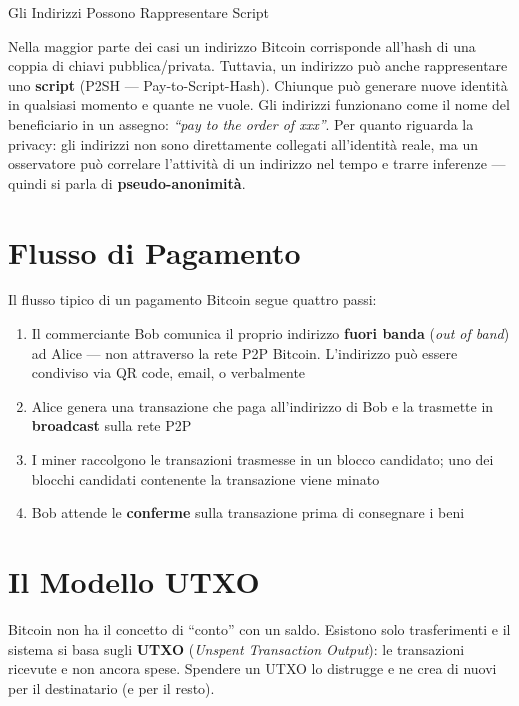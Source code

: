 \documentclass[
  italian,
  openany]{book}
\providecommand{\tightlist}{%
  \setlength{\itemsep}{0pt}\setlength{\parskip}{0pt}}
\begin{document}
\begin{calloutnote}{Gli Indirizzi Possono Rappresentare Script}

Nella maggior parte dei casi un indirizzo Bitcoin corrisponde all'hash
di una coppia di chiavi pubblica/privata. Tuttavia, un indirizzo può
anche rappresentare uno \textbf{script} (P2SH --- Pay-to-Script-Hash).
Chiunque può generare nuove identità in qualsiasi momento e quante ne
vuole. Gli indirizzi funzionano come il nome del beneficiario in un
assegno: \emph{``pay to the order of xxx''}. Per quanto riguarda la
privacy: gli indirizzi non sono direttamente collegati all'identità
reale, ma un osservatore può correlare l'attività di un indirizzo nel
tempo e trarre inferenze --- quindi si parla di
\textbf{pseudo-anonimità}.

\end{calloutnote}

\section{Flusso di Pagamento}\label{flusso-di-pagamento}

Il flusso tipico di un pagamento Bitcoin segue quattro passi:

\begin{enumerate}
\def\labelenumi{\arabic{enumi}.}
\tightlist
\item
  Il commerciante Bob comunica il proprio indirizzo \textbf{fuori banda}
  (\emph{out of band}) ad Alice --- non attraverso la rete P2P Bitcoin.
  L'indirizzo può essere condiviso via QR code, email, o verbalmente
\item
  Alice genera una transazione che paga all'indirizzo di Bob e la
  trasmette in \textbf{broadcast} sulla rete P2P
\item
  I miner raccolgono le transazioni trasmesse in un blocco candidato;
  uno dei blocchi candidati contenente la transazione viene minato
\item
  Bob attende le \textbf{conferme} sulla transazione prima di consegnare
  i beni
\end{enumerate}

\section{Il Modello UTXO}\label{il-modello-utxo}

Bitcoin non ha il concetto di ``conto'' con un saldo. Esistono solo
trasferimenti e il sistema si basa sugli \textbf{UTXO} (\emph{Unspent
Transaction Output}): le transazioni ricevute e non ancora spese.
Spendere un UTXO lo distrugge e ne crea di nuovi per il destinatario (e
per il resto).
\end{document}
